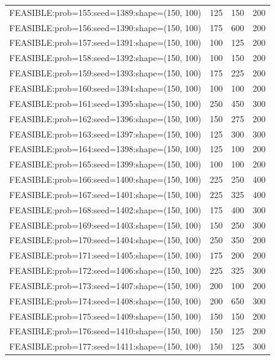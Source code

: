 \begin{longtable}{lccc}
FEASIBLE:prob=155:seed=1389:shape=(150, 100) &      125 &   150 &    200 \\
FEASIBLE:prob=156:seed=1390:shape=(150, 100) &      175 &   600 &    200 \\
FEASIBLE:prob=157:seed=1391:shape=(150, 100) &      100 &   125 &    200 \\
FEASIBLE:prob=158:seed=1392:shape=(150, 100) &      100 &   150 &    200 \\
FEASIBLE:prob=159:seed=1393:shape=(150, 100) &      175 &   225 &    200 \\
FEASIBLE:prob=160:seed=1394:shape=(150, 100) &      100 &   100 &    200 \\
FEASIBLE:prob=161:seed=1395:shape=(150, 100) &      250 &   450 &    300 \\
FEASIBLE:prob=162:seed=1396:shape=(150, 100) &      150 &   275 &    200 \\
FEASIBLE:prob=163:seed=1397:shape=(150, 100) &      125 &   300 &    300 \\
FEASIBLE:prob=164:seed=1398:shape=(150, 100) &      125 &   100 &    200 \\
FEASIBLE:prob=165:seed=1399:shape=(150, 100) &      100 &   100 &    200 \\
FEASIBLE:prob=166:seed=1400:shape=(150, 100) &      225 &   250 &    400 \\
FEASIBLE:prob=167:seed=1401:shape=(150, 100) &      225 &   325 &    400 \\
FEASIBLE:prob=168:seed=1402:shape=(150, 100) &      175 &   400 &    300 \\
FEASIBLE:prob=169:seed=1403:shape=(150, 100) &      150 &   250 &    300 \\
FEASIBLE:prob=170:seed=1404:shape=(150, 100) &      250 &   350 &    200 \\
FEASIBLE:prob=171:seed=1405:shape=(150, 100) &      175 &   200 &    200 \\
FEASIBLE:prob=172:seed=1406:shape=(150, 100) &      225 &   325 &    300 \\
FEASIBLE:prob=173:seed=1407:shape=(150, 100) &      200 &   100 &    200 \\
FEASIBLE:prob=174:seed=1408:shape=(150, 100) &      200 &   650 &    300 \\
FEASIBLE:prob=175:seed=1409:shape=(150, 100) &      150 &   150 &    200 \\
FEASIBLE:prob=176:seed=1410:shape=(150, 100) &      150 &   125 &    200 \\
FEASIBLE:prob=177:seed=1411:shape=(150, 100) &      150 &   125 &    300 \\

\end{longtable}
